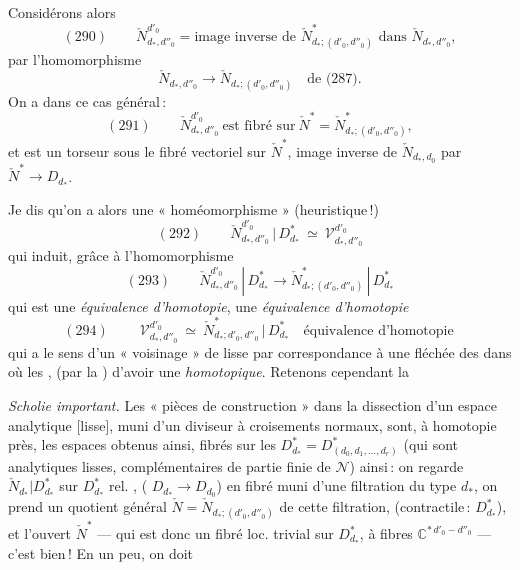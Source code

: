 \documentclass[11pt,a4paper]{article}
\begin{document}
Considérons alors
\[ (290)\qquad \check{N}^{d'_0}_{d_*,d''_0}=\text{image inverse de }\check{N}^*_{d_*;(d'_0,d''_0)}\text{ dans }\check{N}_{d_*,d''_0}, \]
par l'homomorphisme
\[ \check{N}_{d_*,d''_0}\longrightarrow\check{N}_{d_*;(d'_0,d''_0)}\quad\text{de (287)}. \]
On a dans ce cas général\,:
\[ (291)\qquad \check{N}^{d'_0}_{d_*,d''_0}\ \text{est fibré sur}\ \check{N}^*=\check{N}^*_{d_*;(d'_0,d''_0)}, \]
et est un torseur sous le fibré vectoriel sur $\check{N}^*$, image inverse de $\check{N}_{d_*,d_0}$ par $\check{N}^*\to D_{d_*}$.

Je dis qu'on a alors une  « homéomorphisme » (heuristique\,!)
\[ (292)\qquad \check{N}^{d'_0}_{d_*,d''_0}\,|\,D^*_{d_*}\ \simeq\ \mathcal{V}^{d'_0}_{d_*,d''_0} \]
qui induit, grâce à l'homomorphisme
\[ (293)\qquad \check{N}^{d'_0}_{d_*,d''_0}\,|\,D^*_{d_*}\longrightarrow\check{N}^*_{d_*;(d'_0,d''_0)}\,|\,D^*_{d_*} \]
qui est une \emph{équivalence d'homotopie}, une \emph{équivalence d'homotopie}
\[ (294)\qquad \boxed{\ \mathcal{V}^{d'_0}_{d_*,d''_0}\ \simeq\ \check{N}^*_{d_*;d'_0,d''_0}\,|\,D^*_{d_*}\quad\text{équivalence d'homotopie}\ } \]
qui a le sens d'un « voisinage » de lisse par correspondance à une fléchée des   dans   où les  \ill{}, \ill{} (par la \uncertain{\ill{}}) d'avoir une   \emph{homotopique}. Retenons cependant la

\emph{Scholie important.} Les « pièces de construction » dans la dissection d'un espace analytique [lisse], muni d'un diviseur à croisements normaux, sont, à homotopie près, les espaces obtenus ainsi, fibrés sur les $D^*_{d_*}=D^*_{(d_0,d_1,\dots,d_r)}$ (qui sont analytiques lisses, \struck{\ill{}} complémentaires de partie finie  \struck{\ill{}} de $\mathcal{N}$) ainsi\,: on regarde \struck{\ill{}} $\check{N}_{d_*}|D^*_{d_*}$ sur $D^*_{d_*}$ rel. \ill{}, (\ill{} $D_{d_*}\to D_{d_0}$) en fibré  \struck{\ill{}} muni d'une filtration du type $d_*$, on prend un quotient général $\check{N}=\check{N}_{d_*;(d'_0,d''_0)}$ de cette filtration, \struck{\ill{}} (contractile\,: $D^*_{d_*}$), et l'ouvert $\check{N}^*$ --- qui est donc un fibré loc. trivial sur $D^*_{d_*}$, à fibres $\mathbb{C}^{*\,d'_0-d''_0}$ --- c'est bien\,! En  un peu, on doit
\end{document}
